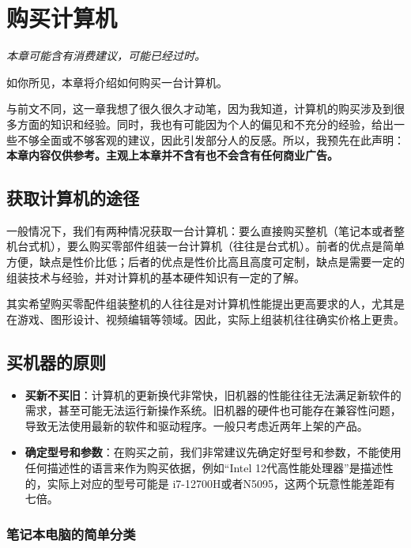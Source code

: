 \documentclass[../main.tex]{subfiles}
\begin{document}
\chapter{购买计算机}

\begin{flushright}
    \emph{本章可能含有消费建议，可能已经过时。}
\end{flushright}

如你所见，本章将介绍如何购买一台计算机。

与前文不同，这一章我想了很久很久才动笔，因为我知道，计算机的购买涉及到很多方面的知识和经验。同时，我也有可能因为个人的偏见和不充分的经验，给出一些不够全面或不够客观的建议，因此引发部分人的反感。所以，我预先在此声明：\textbf{本章内容仅供参考。主观上本章并不含有也不会含有任何商业广告。}

\section{获取计算机的途径}

一般情况下，我们有两种情况获取一台计算机：要么直接购买整机（笔记本或者整机台式机），要么购买零部件组装一台计算机（往往是台式机）。前者的优点是简单方便，缺点是性价比低；后者的优点是性价比高且高度可定制，缺点是需要一定的组装技术与经验，并对计算机的基本硬件知识有一定的了解。

其实希望购买零配件组装整机的人往往是对计算机性能提出更高要求的人，尤其是在游戏、图形设计、视频编辑等领域。因此，实际上组装机往往确实价格上更贵。

\section{买机器的原则}

\begin{itemize}
    \item \textbf{买新不买旧}：计算机的更新换代非常快，旧机器的性能往往无法满足新软件的需求，甚至可能无法运行新操作系统。旧机器的硬件也可能存在兼容性问题，导致无法使用最新的软件和驱动程序。一般只考虑近两年上架的产品。
    \item \textbf{确定型号和参数}：在购买之前，我们非常建议先确定好型号和参数，不能使用任何描述性的语言来作为购买依据，例如“Intel 12代高性能处理器”是描述性的，实际上对应的型号可能是 i7-12700H或者N5095，这两个玩意性能差距有七倍。
\end{itemize}

\subsection{笔记本电脑的简单分类}
\end{document}
